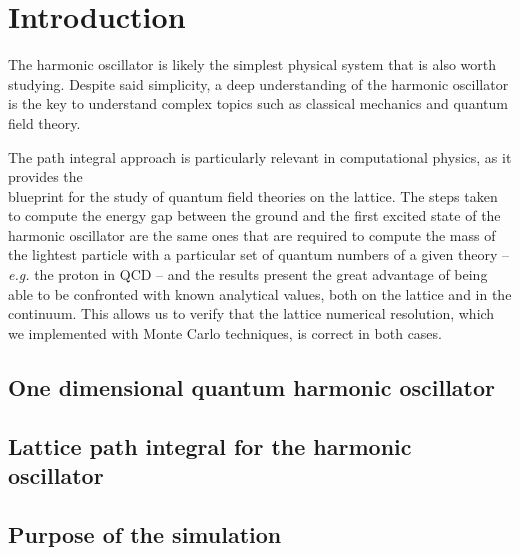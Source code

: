 \section{Introduction}%
\label{sec:Introduction}
The harmonic oscillator is likely the simplest physical system that is also worth studying. Despite said simplicity, a deep understanding of the harmonic oscillator is the key to understand complex topics such  as classical mechanics and quantum field theory.

The path integral approach is particularly relevant in computational physics, as it provides the\\ blueprint for the study of quantum field theories on the lattice.
The steps taken to compute the energy gap between the ground and the first excited state of the harmonic oscillator are the same ones that are
required to compute the mass of the lightest particle with a particular set of quantum numbers of a given theory -- \textit{e.g.}
the proton in QCD -- and the results present the great advantage of being able to be confronted with known analytical values, both
on the lattice and in the continuum.
This allows us to verify that the lattice numerical resolution, which we implemented with Monte Carlo techniques, is correct in both cases.

\subsection{One dimensional quantum harmonic oscillator}%
\label{subsec:1DQHO}


\subsection{Lattice path integral for the harmonic oscillator}%
\label{sec:LPI}


\subsection{Purpose of the simulation}%
\label{subsec:purpose}

